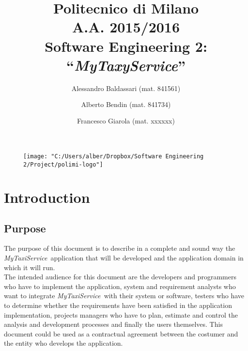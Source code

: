\documentclass[a4paper,11pt]{report} %
\title{Politecnico di Milano\\A.A. 2015/2016\\Software Engineering 2: ``{\em MyTaxyService}''}
\author{Alessandro Baldassari (mat. 841561) \and Alberto Bendin (mat. 841734) \and Francesco Giarola (mat. xxxxxx)}
\newcommand{\mts}{\mbox{\normalfont\itshape MyTaxiService\ }}
\begin{document}
	
	
	\begin{figure}[t]
		\centering
		\texttt{[image: "C:/Users/alber/Dropbox/Software Engineering 2/Project/polimi-logo"]}
		\label{fig:polimi-logo}
	\end{figure}
	
	\maketitle
		
	

	\thispagestyle{empty}
	\clearpage\mbox{}\clearpage
	
	
	
	\renewcommand*\thesection{\arabic{section}}
	\renewcommand*\thesubsection{\arabic{section}.\arabic{subsection}}
	\renewcommand*\thesubsubsection{%
		\arabic{section}.\arabic{subsection}.\arabic{subsubsection}%
	}
	\setcounter{secnumdepth}{3}
	\setcounter{tocdepth}{3}
		
	
	\tableofcontents
	\newpage
	
	
	
	\section{Introduction}
	
	\subsection{Purpose} The purpose of this document is to describe in a complete and sound way
	the \mts application that will be developed and the application domain in which it will run.\\
	The intended audience for this document are the developers and programmers
	who have to implement the application, system and requirement
	analysts who want to integrate \mts with their system or software,
	testers who have to determine whether the requirements have been satisfied in
	the application implementation, projects managers who have to plan, estimate
	and control the analysis and development processes and finally the users themselves.
	This document could be used as a contractual agreement between the costumer
	and the entity who develops the application.
	
\end{document}
